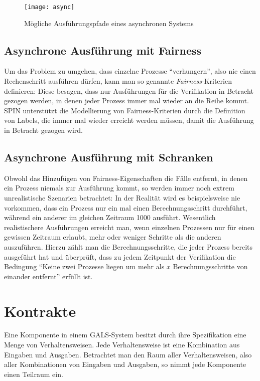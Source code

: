 \begin{figure}[h]
  \centering
  \texttt{[image: async]}
  \caption{Mögliche Ausführungspfade eines asynchronen Systems}
  \label{fig:asynchronous_paths}
\end{figure}
\subsection{Asynchrone Ausführung mit Fairness}
Um das Problem zu umgehen, dass einzelne Prozesse "`verhungern"', also nie einen Rechenschritt ausführen dürfen, kann man so genannte \emph{Fairness}-Kriterien definieren:
Diese besagen, dass nur Ausführungen für die Verifikation in Betracht gezogen werden, in denen jeder Prozess immer mal wieder an die Reihe kommt.
SPIN unterstützt die Modellierung von Fairness-Kriterien durch die Definition von Labels, die immer mal wieder erreicht werden müssen, damit die Ausführung in Betracht gezogen wird.
\subsection{Asynchrone Ausführung mit Schranken}
Obwohl das Hinzufügen von Fairness-Eigenschaften die Fälle entfernt, in denen ein Prozess niemals zur Ausführung kommt, so werden immer noch extrem unrealistische Szenarien betrachtet:
In der Realität wird es beispielsweise nie vorkommen, dass ein Prozess nur ein mal einen Berechnungsschritt durchführt, während ein anderer im gleichen Zeitraum 1000 ausführt.
Wesentlich realistischere Ausführungen erreicht man, wenn einzelnen Prozessen nur für einen gewissen Zeitraum erlaubt, mehr oder weniger Schritte als die anderen auszuführen.
Hierzu zählt man die Berechnungsschritte, die jeder Prozess bereits ausgeführt hat und überprüft, dass zu jedem Zeitpunkt der Verifikation die Bedingung "`Keine zwei Prozesse liegen um mehr als $x$ Berechnungsschritte von einander entfernt"' erfüllt ist.
\section{Kontrakte}
Eine Komponente in einem GALS-System besitzt durch ihre Spezifikation eine Menge von Verhaltensweisen.
Jede Verhaltensweise ist eine Kombination aus Eingaben und Ausgaben.
Betrachtet man den Raum aller Verhaltensweisen, also aller Kombinationen von Eingaben und Ausgaben, so nimmt jede Komponente einen Teilraum ein.

